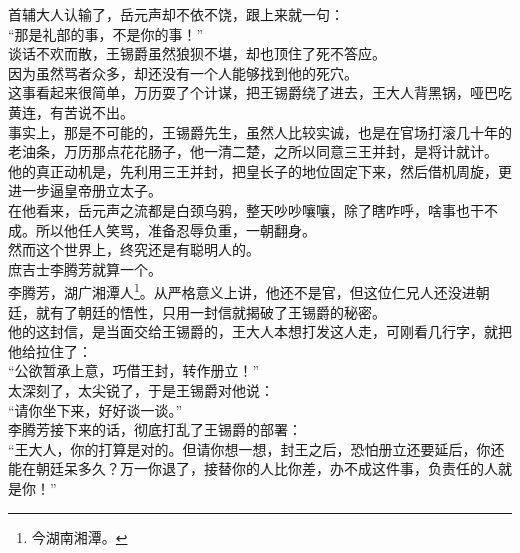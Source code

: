 \begin{multicols}{\theparacolNo}
首辅大人认输了，岳元声却不依不饶，跟上来就一句：\\

“那是礼部的事，不是你的事！”\\

谈话不欢而散，王锡爵虽然狼狈不堪，却也顶住了死不答应。\\

因为虽然骂者众多，却还没有一个人能够找到他的死穴。\\

这事看起来很简单，万历耍了个计谋，把王锡爵绕了进去，王大人背黑锅，哑巴吃黄连，有苦说不出。\\

事实上，那是不可能的，王锡爵先生，虽然人比较实诚，也是在官场打滚几十年的老油条，万历那点花花肠子，他一清二楚，之所以同意三王并封，是将计就计。\\

他的真正动机是，先利用三王并封，把皇长子的地位固定下来，然后借机周旋，更进一步逼皇帝册立太子。\\

在他看来，岳元声之流都是白颈乌鸦，整天吵吵嚷嚷，除了瞎咋呼，啥事也干不成。所以他任人笑骂，准备忍辱负重，一朝翻身。\\

然而这个世界上，终究还是有聪明人的。\\

庶吉士李腾芳就算一个。\\

李腾芳，湖广湘潭人\footnote{今湖南湘潭。}。从严格意义上讲，他还不是官，但这位仁兄人还没进朝廷，就有了朝廷的悟性，只用一封信就揭破了王锡爵的秘密。\\

他的这封信，是当面交给王锡爵的，王大人本想打发这人走，可刚看几行字，就把他给拉住了：\\

“公欲暂承上意，巧借王封，转作册立！”\\

太深刻了，太尖锐了，于是王锡爵对他说：\\

“请你坐下来，好好谈一谈。”\\

李腾芳接下来的话，彻底打乱了王锡爵的部署：\\

“王大人，你的打算是对的。但请你想一想，封王之后，恐怕册立还要延后，你还能在朝廷呆多久？万一你退了，接替你的人比你差，办不成这件事，负责任的人就是你！”\\


\end{multicols}
